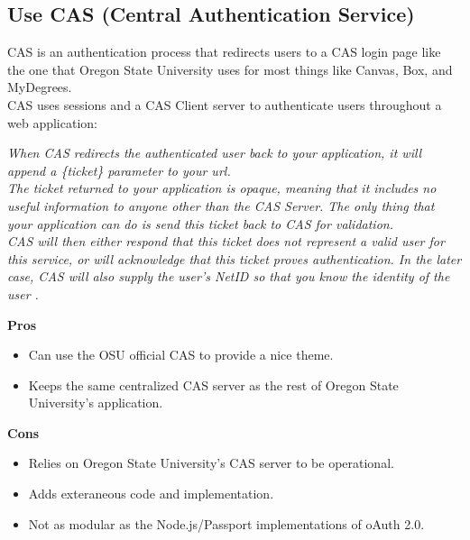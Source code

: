 \documentclass[onecolumn, draftclsnofoot,10pt, compsoc]{IEEEtran}
\begin{document}
\subsection{Use CAS (Central Authentication Service)}
CAS is an authentication process that redirects users to a CAS login page like the one that Oregon State University uses for most things like Canvas, Box, and MyDegrees.\\

CAS uses sessions and a CAS Client server to authenticate users throughout a web application:
\begin{adjustwidth}{2cm}{2cm}
    \textit{\noindent When CAS redirects the authenticated user back to your application, it will append a \{ticket\} parameter to your url.\\
    \noindent The ticket returned to your application is opaque, meaning that it includes no useful information to anyone other than the CAS Server. The only thing that your application can do is send this ticket back to CAS for validation.\\
    \noindent CAS will then either respond that this ticket does not represent a valid user for this service, or will acknowledge that this ticket proves authentication. In the later case, CAS will also supply the user's NetID so that you know the identity of the user \cite{how_cas_works}.}
\end{adjustwidth} 
\textbf{Pros}
\begin{itemize}
    \item Can use the OSU official CAS to provide a nice theme.
    \item Keeps the same centralized CAS server as the rest of Oregon State University's application.
\end{itemize}
\textbf{Cons}
\begin{itemize}
    \item Relies on Oregon State University's CAS server to be operational. 
    \item Adds exteraneous code and implementation.
    \item Not as modular as the Node.js/Passport implementations of oAuth 2.0.
\end{itemize}
\end{document}
